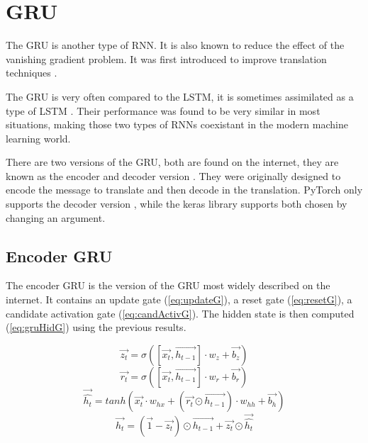 \section{\acs{GRU}}\label{sec:gru}
The \acf{GRU} is another type of \ac{RNN}. It is also known to reduce the effect of the vanishing gradient problem. It was first introduced to improve translation techniques \cite{gru}.

The \ac{GRU} is very often compared to the \ac{LSTM}, it is sometimes assimilated as a type of \ac{LSTM} \cite{nbLSTM}. Their performance was found to be very similar in most situations, making those two types of \acp{RNN} coexistant in the modern machine learning world.

There are two versions of the \ac{GRU}, both are found on the internet, they are known as the encoder and decoder version \cite{gru}. They were originally designed to encode the message to translate and then decode in the translation. PyTorch only supports the decoder version \cite{gruPyTorch}, while the keras library supports both \cite{gruKeras} chosen by changing an argument.

\subsection{Encoder \ac{GRU}}

The encoder \ac{GRU} is the version of the \ac{GRU} most widely described on the internet. It contains an update gate (\cref{eq:updateG}), a reset gate (\cref{eq:resetG}), a candidate activation gate (\cref{eq:candActivG}). The hidden state is then computed (\cref{eq:gruHidG}) using the previous results.

\begin{equation}\label{eq:updateG}
  \overrightarrow{z_t}=\sigma ([\overrightarrow{x_t},\overrightarrow{h_{t-1}}] \cdot w_z + \overrightarrow{b_z})
\end{equation}
\begin{equation}\label{eq:resetG}
  \overrightarrow{r_t}=\sigma ([\overrightarrow{x_t},\overrightarrow{h_{t-1}}] \cdot w_r + \overrightarrow{b_r})
\end{equation}
\begin{equation}\label{eq:candActivG}
  \overrightarrow{\hat{h_t}}=tanh(\overrightarrow{x_t}\cdot w_{hx}+(\overrightarrow{r_t}\odot\overrightarrow{h_{t-1}}) \cdot w_{hh} + \overrightarrow{b_h})
\end{equation}
\begin{equation}\label{eq:gruHidG}
  \overrightarrow{h_t}=(\overrightarrow{1}-\overrightarrow{z_t})\odot \overrightarrow{h_{t-1}} + \overrightarrow{z_t}\odot \overrightarrow{\hat{h_t}}
\end{equation}

